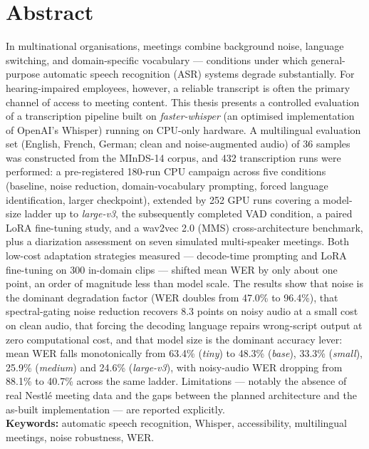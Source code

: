 \documentclass[12pt]{report}
\begin{document}
\section*{Abstract}
In multinational organisations, meetings combine background noise, language switching, and domain-specific vocabulary --- conditions under which general-purpose automatic speech recognition (ASR) systems degrade substantially. For hearing-impaired employees, however, a reliable transcript is often the primary channel of access to meeting content. This thesis presents a controlled evaluation of a transcription pipeline built on \textit{faster-whisper} (an optimised implementation of OpenAI's Whisper) running on CPU-only hardware. A multilingual evaluation set (English, French, German; clean and noise-augmented audio) of 36 samples was constructed from the MInDS-14 corpus, and 432 transcription runs were performed: a pre-registered 180-run CPU campaign across five conditions (baseline, noise reduction, domain-vocabulary prompting, forced language identification, larger checkpoint), extended by 252 GPU runs covering a model-size ladder up to \textit{large-v3}, the subsequently completed VAD condition, a paired LoRA fine-tuning study, and a wav2vec 2.0 (MMS) cross-architecture benchmark, plus a diarization assessment on seven simulated multi-speaker meetings. Both low-cost adaptation strategies measured --- decode-time prompting and LoRA fine-tuning on 300 in-domain clips --- shifted mean WER by only about one point, an order of magnitude less than model scale. The results show that noise is the dominant degradation factor (WER doubles from 47.0\% to 96.4\%), that spectral-gating noise reduction recovers 8.3 points on noisy audio at a small cost on clean audio, that forcing the decoding language repairs wrong-script output at zero computational cost, and that model size is the dominant accuracy lever: mean WER falls monotonically from 63.4\% (\textit{tiny}) to 48.3\% (\textit{base}), 33.3\% (\textit{small}), 25.9\% (\textit{medium}) and 24.6\% (\textit{large-v3}), with noisy-audio WER dropping from 88.1\% to 40.7\% across the same ladder. Limitations --- notably the absence of real Nestlé meeting data and the gaps between the planned architecture and the as-built implementation --- are reported explicitly.
\\
\textbf{Keywords:} automatic speech recognition, Whisper, accessibility, multilingual meetings, noise robustness, WER.
\thispagestyle{fancy}
\end{document}
